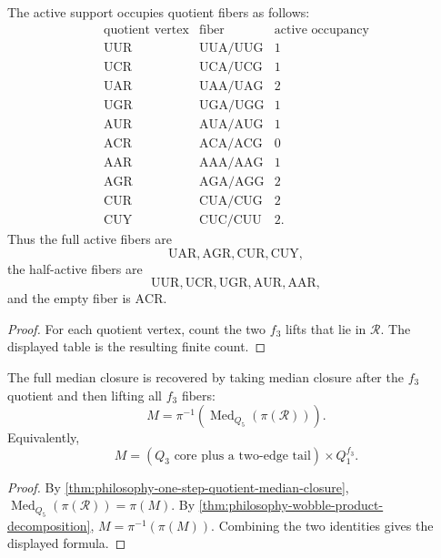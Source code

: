 \begin{theorem}
\label{thm:philosophy-wobble-pair-occupancy}
The active support occupies quotient fibers as follows:
$$
\begin{array}{c|c|r}
  \text{quotient vertex} & \text{fiber} & \text{active occupancy}\\
  \hline
  \mathrm{UUR} & \mathrm{UUA}/\mathrm{UUG} & 1\\
  \mathrm{UCR} & \mathrm{UCA}/\mathrm{UCG} & 1\\
  \mathrm{UAR} & \mathrm{UAA}/\mathrm{UAG} & 2\\
  \mathrm{UGR} & \mathrm{UGA}/\mathrm{UGG} & 1\\
  \mathrm{AUR} & \mathrm{AUA}/\mathrm{AUG} & 1\\
  \mathrm{ACR} & \mathrm{ACA}/\mathrm{ACG} & 0\\
  \mathrm{AAR} & \mathrm{AAA}/\mathrm{AAG} & 1\\
  \mathrm{AGR} & \mathrm{AGA}/\mathrm{AGG} & 2\\
  \mathrm{CUR} & \mathrm{CUA}/\mathrm{CUG} & 2\\
  \mathrm{CUY} & \mathrm{CUC}/\mathrm{CUU} & 2.
\end{array}
$$
Thus the full active fibers are
$$
  \mathrm{UAR},\mathrm{AGR},\mathrm{CUR},\mathrm{CUY},
$$
the half-active fibers are
$$
  \mathrm{UUR},\mathrm{UCR},\mathrm{UGR},\mathrm{AUR},\mathrm{AAR},
$$
and the empty fiber is $\mathrm{ACR}$.
\end{theorem}
\begin{proof}
For each quotient vertex, count the two $f_{3}$ lifts that lie in
$\mathcal{R}$. The displayed table is the resulting finite count.
\end{proof}

\begin{theorem}
\label{thm:philosophy-wobble-quotient-closure}
The full median closure is recovered by taking median closure after
the $f_{3}$ quotient and then lifting all $f_{3}$ fibers:
$$
  M
  =
  \pi^{-1}\!\left(\operatorname{Med}_{Q_{5}}(\pi(\mathcal{R}))\right).
$$
Equivalently,
$$
  M=(Q_{3}\text{ core plus a two-edge tail})\times Q_{1}^{f_{3}}.
$$
\end{theorem}
\begin{proof}
By \autoref{thm:philosophy-one-step-quotient-median-closure},
$\operatorname{Med}_{Q_{5}}(\pi(\mathcal{R}))=\pi(M)$. By
\autoref{thm:philosophy-wobble-product-decomposition},
$M=\pi^{-1}(\pi(M))$. Combining the two identities gives the displayed
formula.
\end{proof}

